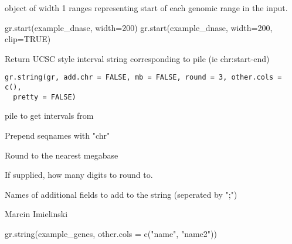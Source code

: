 \documentclass[a4paper]{book}
\begin{document}
%
\begin{Value}
 object of width 1 ranges representing start of each genomic range in the input.
\end{Value}
%
\begin{Examples}
\begin{ExampleCode}
gr.start(example_dnase, width=200)
gr.start(example_dnase, width=200, clip=TRUE)
\end{ExampleCode}
\end{Examples}
%
\begin{Description}\relax
Return UCSC style interval string corresponding to  pile (ie chr:start-end)
\end{Description}
%
\begin{Usage}
\begin{verbatim}
gr.string(gr, add.chr = FALSE, mb = FALSE, round = 3, other.cols = c(),
  pretty = FALSE)
\end{verbatim}
\end{Usage}
%
\begin{Arguments}
\begin{ldescription}
\item[\code{gr}]  pile to get intervals from

\item[\code{add.chr}] Prepend seqnames with "chr" \code{[FALSE]}

\item[\code{mb}] Round to the nearest megabase \code{[FALSE]}

\item[\code{round}] If  supplied, how many digits to round to. \code{[3]}

\item[\code{other.cols}] Names of additional  fields to add to the string (seperated by ";")
\end{ldescription}
\end{Arguments}
%
\begin{Author}\relax
Marcin Imielinski
\end{Author}
%
\begin{Examples}
\begin{ExampleCode}
gr.string(example_genes, other.cols = c("name", "name2"))
\end{ExampleCode}
\end{Examples}
\end{document}
